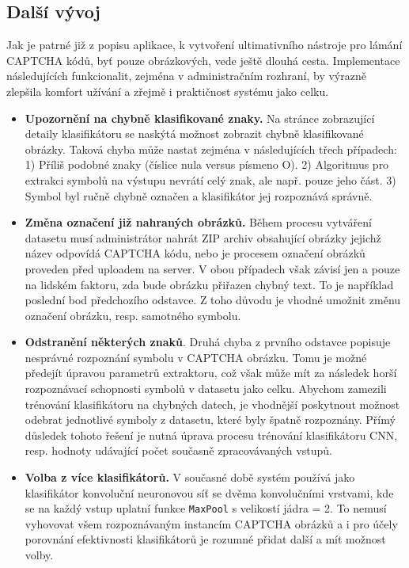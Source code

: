 \documentclass[
  master=true,
  biblatex,
  glossaries,
  index
]{kidiplom}
\begin{document}
\subsection*{Další vývoj}
Jak je patrné již z popisu aplikace, k vytvoření ultimativního nástroje pro lámání CAPTCHA kódů, byť pouze obrázkových, vede ještě dlouhá cesta. Implementace následujících funkcionalit, zejména v administračním rozhraní, by výrazně zlepšila komfort užívání a zřejmě i praktičnost systému jako celku.

\begin{itemize}
\item \textbf{Upozornění na chybně klasifikované znaky.} Na stránce zobrazující detaily klasifikátoru se naskýtá možnost zobrazit chybně klasifikované obrázky. Taková chyba může nastat zejména v následujících třech případech: 1) Příliš podobné znaky (číslice nula versus písmeno O). 2) Algoritmus pro extrakci symbolů na výstupu nevrátí celý znak, ale např. pouze jeho část. 3) Symbol byl ručně chybně označen a klasifikátor jej rozpoznává správně.
\item \textbf{Změna označení již nahraných obrázků.} Během procesu vytváření datasetu musí administrátor nahrát ZIP archiv obsahující obrázky jejichž název odpovídá CAPTCHA kódu, nebo je procesem označení obrázků proveden před uploadem na server. V obou případech však závisí jen a pouze na lidském faktoru, zda bude obrázku přiřazen chybný text. To je například poslední bod předchozího odstavce. Z toho důvodu je vhodné umožnit změnu označení obrázku, resp. samotného symbolu.
\item \textbf{Odstranění některých znaků}. Druhá chyba z prvního odstavce popisuje nesprávné rozpoznání symbolu v CAPTCHA obrázku. Tomu je možné předejít úpravou parametrů extraktoru, což však může mít za následek horší rozpoznávací schopnosti symbolů v datasetu jako celku. Abychom zamezili trénování klasifikátoru na chybných datech, je vhodnější poskytnout možnost odebrat jednotlivé symboly z datasetu, které byly špatně rozpoznány. Přímý důsledek tohoto řešení je nutná úprava procesu trénování klasifikátoru CNN, resp. hodnoty udávající počet současně zpracovávaných vstupů.
\item  \textbf{Volba z více klasifikátorů.} V současné době systém používá jako klasifikátor konvoluční neuronovou síť se dvěma konvolučními vrstvami, kde se na každý vstup uplatní funkce \texttt{MaxPool} s velikostí jádra = 2. To nemusí vyhovovat všem rozpoznávaným instancím CAPTCHA obrázků a i pro účely porovnání efektivnosti klasifikátorů je rozumné přidat další a mít možnost volby. 

\end{itemize}
\end{document}
